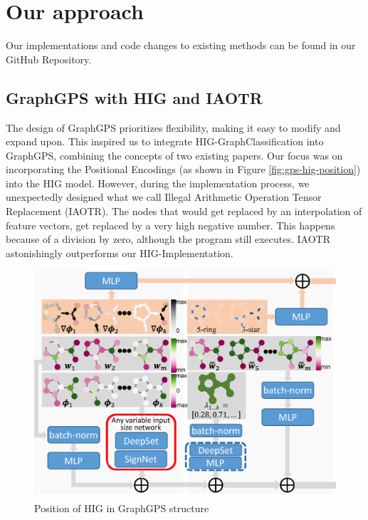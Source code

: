 \section{Our approach}
Our implementations and code changes to existing methods can be found in our GitHub Repository\cite{our_repo}.

\subsection{GraphGPS with HIG and IAOTR}
\label{sec:graphgps_hig}
The design of GraphGPS prioritizes flexibility, making it easy to modify and expand upon. This inspired us to integrate HIG-GraphClassification into GraphGPS, combining the concepts of two existing papers. Our focus was on incorporating the Positional Encodings (as shown in Figure \autoref{fig:gps-hig-position}) into the HIG model. However, during the implementation process, we unexpectedly designed what we call Illegal Arithmetic Operation Tensor Replacement (IAOTR). The nodes that would get replaced by an interpolation of feature vectors, get replaced by a very high negative number. This happens because of a division by zero, although the program still executes. IAOTR astonishingly outperforms our HIG-Implementation.

\begin{figure}[!ht]
    \centering
    \includegraphics[scale=0.2]{tex/res/gps_hig_position.png}
    \caption{Position of HIG in GraphGPS structure}
    \label{fig:gps-hig-position}
\end{figure}


